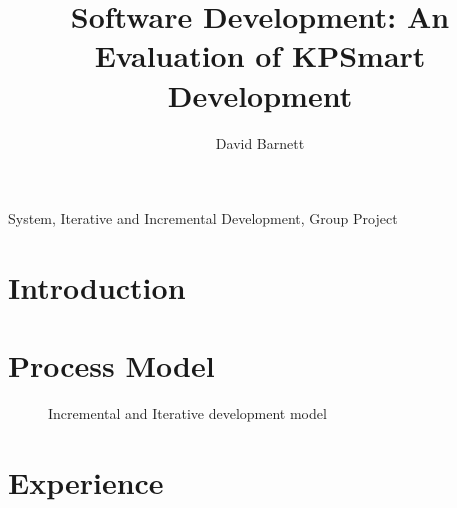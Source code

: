 \documentclass{style/CRPITStyle}
\begin{document}
\title{Software Development: An Evaluation of KPSmart Development}
\author{David Barnett}

\maketitle

\begin{abstract}
\end{abstract}

\vspace{.1in}

\/ System, Iterative and Incremental Development, Group Project

\vspace{.1in}

\section{Introduction}

\section{Process Model}


\begin{figure}[htb]
\caption{\protect\label{s-system} Incremental and Iterative development model }
\end{figure}

\section{Experience}
\end{document}
